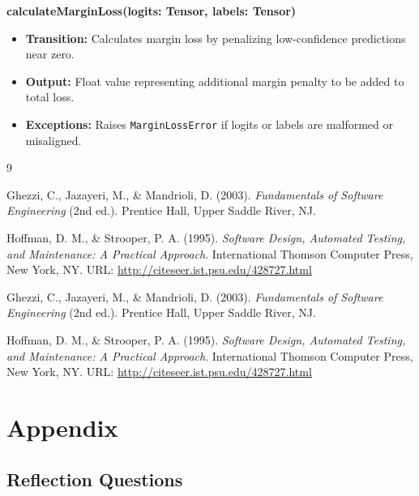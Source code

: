 \documentclass[12pt, titlepage]{article}
\begin{document}
\textbf{calculateMarginLoss(logits: Tensor, labels: Tensor)}

\begin{itemize}
    \item \textbf{Transition:} Calculates margin loss by penalizing low-confidence predictions near zero.
    \item \textbf{Output:} Float value representing additional margin penalty to be added to total loss.
    \item \textbf{Exceptions:} Raises \texttt{MarginLossError} if logits or labels are malformed or misaligned.
\end{itemize}




\begin{thebibliography}{9}

Ghezzi, C., Jazayeri, M., \& Mandrioli, D. (2003). 
\textit{Fundamentals of Software Engineering} (2nd ed.). 
Prentice Hall, Upper Saddle River, NJ.

Hoffman, D. M., \& Strooper, P. A. (1995). 
\textit{Software Design, Automated Testing, and Maintenance: A Practical Approach}. 
International Thomson Computer Press, New York, NY. 
URL: \url{http://citeseer.ist.psu.edu/428727.html}

Ghezzi, C., Jazayeri, M., \& Mandrioli, D. (2003). 
\textit{Fundamentals of Software Engineering} (2nd ed.). 
Prentice Hall, Upper Saddle River, NJ.

Hoffman, D. M., \& Strooper, P. A. (1995). 
\textit{Software Design, Automated Testing, and Maintenance: A Practical Approach}. 
International Thomson Computer Press, New York, NY. 
URL: \url{http://citeseer.ist.psu.edu/428727.html}

\end{thebibliography}





\newpage

\section{Appendix}
\label{sec:appendix}

\subsection{Reflection Questions}
\label{sec:reflectionquestions}
\end{document}
